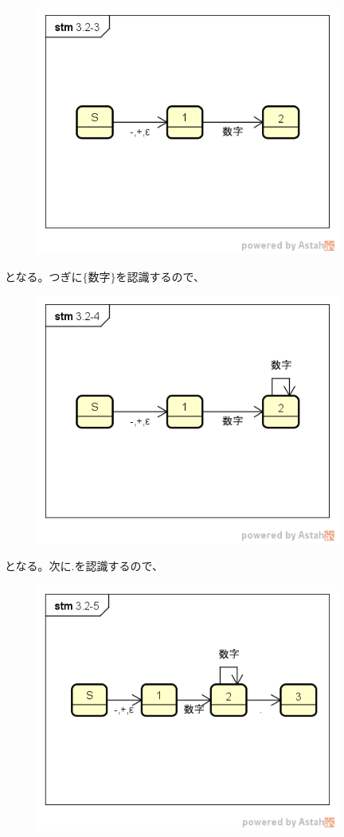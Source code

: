 \documentclass[a4paper,12pt]{jarticle}
\begin{document}
\begin{figure}[H]
 \begin{center}
  \includegraphics[width=10cm]{Automatonfig/3-2-3.png}
 \end{center}
\end{figure}
となる。つぎに$ \{ 数字 \} $を認識するので、
\begin{figure}[H]
 \begin{center}
  \includegraphics[width=10cm]{Automatonfig/3-2-4.png}
 \end{center}
\end{figure}
となる。次に$ . $を認識するので、
\begin{figure}[H]
 \begin{center}
  \includegraphics[width=10cm]{Automatonfig/3-2-5.png}
 \end{center}
\end{figure}
\end{document}
